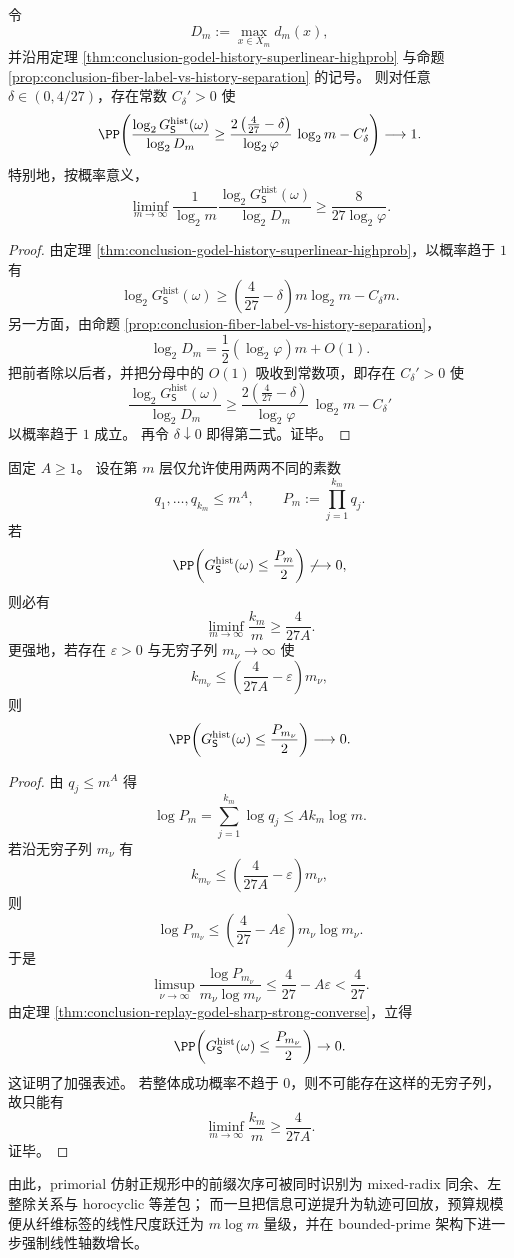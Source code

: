 \begin{corollary}[可回放历史相对于纤维标签的显式对数鸿沟常数]\label{cor:conclusion-replay-godel-vs-fiber-label-explicit-gap}
令
\[
D_m:=\max_{x\in X_m}d_m(x),
\]
并沿用定理 \ref{thm:conclusion-godel-history-superlinear-highprob} 与命题 \ref{prop:conclusion-fiber-label-vs-history-separation} 的记号。
则对任意 \(\delta\in(0,4/27)\)，存在常数 \(C_\delta'>0\) 使
\[
\PP\!\left(
\frac{\log_2 G_{\mathsf S}^{\mathrm{hist}}(\omega)}{\log_2 D_m}
\ge
\frac{2\left(\frac{4}{27}-\delta\right)}{\log_2\varphi}\,\log_2 m-C_\delta'
\right)\longrightarrow 1.
\]
特别地，按概率意义，
\[
\liminf_{m\to\infty}
\frac{1}{\log_2 m}
\frac{\log_2 G_{\mathsf S}^{\mathrm{hist}}(\omega)}{\log_2 D_m}
\ge
\frac{8}{27\log_2\varphi}.
\]
\end{corollary}
\begin{proof}
由定理 \ref{thm:conclusion-godel-history-superlinear-highprob}，以概率趋于 \(1\) 有
\[
\log_2 G_{\mathsf S}^{\mathrm{hist}}(\omega)
\ge
\left(\frac{4}{27}-\delta\right)m\log_2 m-C_\delta m.
\]
另一方面，由命题 \ref{prop:conclusion-fiber-label-vs-history-separation}，
\[
\log_2 D_m=\frac12(\log_2\varphi)m+O(1).
\]
把前者除以后者，并把分母中的 \(O(1)\) 吸收到常数项，即存在 \(C_\delta'>0\) 使
\[
\frac{\log_2 G_{\mathsf S}^{\mathrm{hist}}(\omega)}{\log_2 D_m}
\ge
\frac{2\left(\frac{4}{27}-\delta\right)}{\log_2\varphi}\,\log_2 m-C_\delta'
\]
以概率趋于 \(1\) 成立。
再令 \(\delta\downarrow 0\) 即得第二式。证毕。
\end{proof}

\begin{theorem}\label{thm:conclusion-bounded-prime-replay-linear-axis-lower-bound}
固定 \(A\ge 1\)。
设在第 \(m\) 层仅允许使用两两不同的素数
\[
q_1,\dots,q_{k_m}\le m^A,
\qquad
P_m:=\prod_{j=1}^{k_m}q_j.
\]
若
\[
\PP\!\left(
G_{\mathsf S}^{\mathrm{hist}}(\omega)\le \frac{P_m}{2}
\right)
\not\longrightarrow 0,
\]
则必有
\[
\liminf_{m\to\infty}\frac{k_m}{m}\ge \frac{4}{27A}.
\]
更强地，若存在 \(\varepsilon>0\) 与无穷子列 \(m_\nu\to\infty\) 使
\[
k_{m_\nu}\le \left(\frac{4}{27A}-\varepsilon\right)m_\nu,
\]
则
\[
\PP\!\left(
G_{\mathsf S}^{\mathrm{hist}}(\omega)\le \frac{P_{m_\nu}}{2}
\right)\longrightarrow 0.
\]
\end{theorem}
\begin{proof}
由 \(q_j\le m^A\) 得
\[
\log P_m=\sum_{j=1}^{k_m}\log q_j\le Ak_m\log m.
\]
若沿无穷子列 \(m_\nu\) 有
\[
k_{m_\nu}\le \left(\frac{4}{27A}-\varepsilon\right)m_\nu,
\]
则
\[
\log P_{m_\nu}
\le
\left(\frac{4}{27}-A\varepsilon\right)m_\nu\log m_\nu.
\]
于是
\[
\limsup_{\nu\to\infty}\frac{\log P_{m_\nu}}{m_\nu\log m_\nu}
\le
\frac{4}{27}-A\varepsilon
<
\frac{4}{27}.
\]
由定理 \ref{thm:conclusion-replay-godel-sharp-strong-converse}，立得
\[
\PP\!\left(
G_{\mathsf S}^{\mathrm{hist}}(\omega)\le \frac{P_{m_\nu}}{2}
\right)\to 0.
\]
这证明了加强表述。
若整体成功概率不趋于 \(0\)，则不可能存在这样的无穷子列，故只能有
\[
\liminf_{m\to\infty}\frac{k_m}{m}\ge \frac{4}{27A}.
\]
证毕。
\end{proof}

由此，primorial 仿射正规形中的前缀次序可被同时识别为 mixed-radix 同余、左整除关系与 horocyclic 等差包；
而一旦把信息可逆提升为轨迹可回放，预算规模便从纤维标签的线性尺度跃迁为 \(m\log m\) 量级，并在 bounded-prime 架构下进一步强制线性轴数增长。
